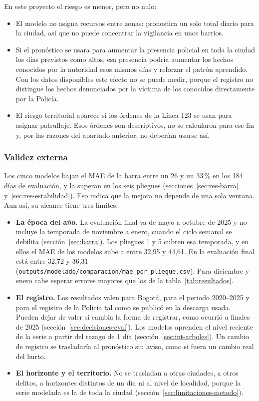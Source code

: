 En este proyecto el riesgo es menor, pero no nulo:
\begin{itemize}
  \item El modelo no asigna recursos entre zonas: pronostica un solo total diario para la ciudad, así que no puede concentrar la vigilancia en unos barrios.
  \item Si el pronóstico se usara para aumentar la presencia policial en toda la ciudad los días previstos como altos, esa presencia podría aumentar los hechos conocidos por la autoridad esos mismos días y reforzar el patrón aprendido. Con los datos disponibles este efecto no se puede medir, porque el registro no distingue los hechos denunciados por la víctima de los conocidos directamente por la Policía.
  \item El riesgo territorial aparece si los órdenes de la Línea 123 se usan para asignar patrullaje. Esos órdenes son descriptivos, no se calcularon para ese fin y, por las razones del apartado anterior, no deberían usarse así.
\end{itemize}

\subsubsection{Validez externa}

Los cinco modelos bajan el MAE de la barra entre un 26 y un 33\,\% en los 184 días de evaluación, y la superan en los seis pliegues (secciones~\ref{sec:res-barra} y~\ref{sec:res-estabilidad}). Eso indica que la mejora no depende de una sola ventana. Aun así, su alcance tiene tres límites:
\begin{itemize}
  \item \textbf{La época del año.} La evaluación final va de mayo a octubre de 2025 y no incluye la temporada de noviembre a enero, cuando el ciclo semanal se debilita (sección~\ref{sec:barra}). Los pliegues 1 y 5 cubren esa temporada, y en ellos el MAE de los modelos sube a entre 32,95 y 44,61. En la evaluación final está entre 32,72 y 36,31 (\texttt{outputs/\allowbreak{}modelado/\allowbreak{}comparacion/\allowbreak{}mae\_\allowbreak{}por\_\allowbreak{}pliegue.csv}). Para diciembre y enero cabe esperar errores mayores que los de la tabla~\ref{tab:resultados}.
  \item \textbf{El registro.} Los resultados valen para Bogotá, para el periodo 2020--2025 y para el registro de la Policía tal como se publicó en la descarga usada. Pueden dejar de valer si cambia la forma de registrar, como ocurrió a finales de 2025 (sección~\ref{sec:decisiones-eval}). Los modelos aprenden el nivel reciente de la serie a partir del rezago de 1 día (sección~\ref{sec:int-arboles}). Un cambio de registro se trasladaría al pronóstico sin aviso, como si fuera un cambio real del hurto.
  \item \textbf{El horizonte y el territorio.} No se trasladan a otras ciudades, a otros delitos, a horizontes distintos de un día ni al nivel de localidad, porque la serie modelada es la de toda la ciudad (sección~\ref{sec:limitaciones-metodo}).
\end{itemize}


